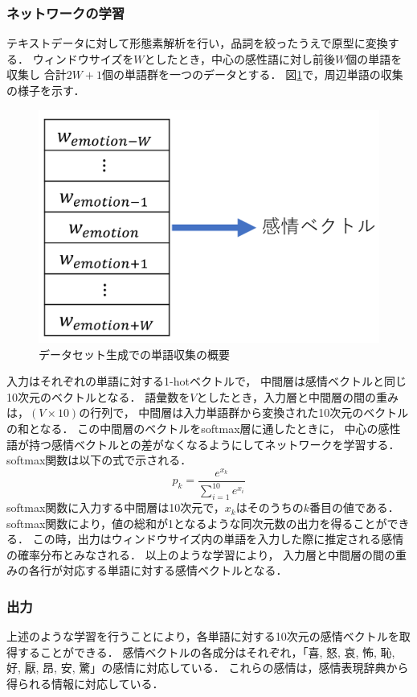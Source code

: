 		\subsubsection{ネットワークの学習}
		テキストデータに対して形態素解析を行い，品詞を絞ったうえで原型に変換する．
		ウィンドウサイズを$W$としたとき，中心の感性語に対し前後$W$個の単語を収集し
		合計$2W+1$個の単語群を一つのデータとする．
		図\ref{fig:takeuchi_dataset}で，周辺単語の収集の様子を示す．
		\begin{figure}[H]
			\centering
			\includegraphics[width=\linewidth]{./figure/takeuchi_dataset.png}
			\caption{データセット生成での単語収集の概要}
			\label{fig:takeuchi_dataset}
		\end{figure}
		入力はそれぞれの単語に対する1-hotベクトルで，
		中間層は感情ベクトルと同じ10次元のベクトルとなる．
		語彙数を$V$としたとき，入力層と中間層の間の重みは，$(V \times 10)$の行列で，
		中間層は入力単語群から変換された10次元のベクトルの和となる．
		この中間層のベクトルをsoftmax層に通したときに，
		中心の感性語が持つ感情ベクトルとの差がなくなるようにしてネットワークを学習する．
		softmax関数は以下の式で示される．
		\begin{equation}
			p_k = \frac{e^{x_k}}{\sum_{i=1}^{10}e^{x_i}}
		\end{equation}
		softmax関数に入力する中間層は10次元で，$x_k$はそのうちの$k$番目の値である．
		softmax関数により，値の総和が1となるような同次元数の出力を得ることができる．
		この時，出力はウィンドウサイズ内の単語を入力した際に推定される感情の確率分布とみなされる．
		以上のような学習により，
		入力層と中間層の間の重みの各行が対応する単語に対する感情ベクトルとなる．

		\subsubsection{出力}
		上述のような学習を行うことにより，各単語に対する10次元の感情ベクトルを取得することができる．
		感情ベクトルの各成分はそれぞれ，「喜, 怒, 哀, 怖, 恥, 好, 厭, 昂, 安, 驚」の感情に対応している．
		これらの感情は，感情表現辞典から得られる情報に対応している．

